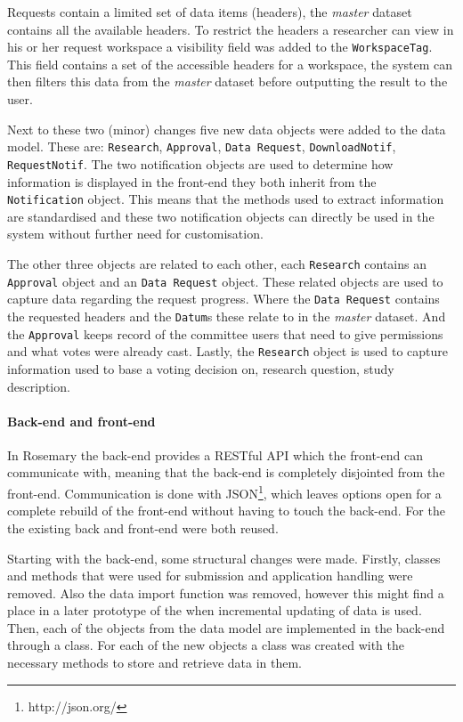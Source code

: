 Requests contain a limited set of data items (headers), the \emph{master} dataset contains all the available headers.
To restrict the headers a researcher can view in his or her request workspace a visibility field was added to the {\tt WorkspaceTag}.
This field contains a set of the accessible headers for a workspace, the system can then filters this data from the \emph{master} dataset before outputting the result to the user.

Next to these two (minor) changes five new data objects were added to the data model.
These are: {\tt Research}, {\tt Approval}, {\tt Data Request}, {\tt DownloadNotif}, {\tt RequestNotif}.
The two notification objects are used to determine how information is displayed in the front-end they both inherit from the {\tt Notification} object.
This means that the methods used to extract information are standardised and these two notification objects can directly be used in the system without further need for customisation.

The other three objects are related to each other, each {\tt Research} contains an {\tt Approval} object and an {\tt Data Request} object.
These related objects are used to capture data regarding the request progress.
Where the {\tt Data Request} contains the requested headers and the {\tt Datum}s these relate to in the \emph{master} dataset.
And the {\tt Approval} keeps record of the committee users that need to give permissions and what votes were already cast.
Lastly, the {\tt Research} object is used to capture information used to base a voting decision on, \eg{} research question, study description.

\paragraph{Back-end and front-end}
In Rosemary the back-end provides a RESTful API which the front-end can communicate with, meaning that the back-end is completely disjointed from the front-end.
Communication is done with JSON\footnote{http://json.org/}, which leaves options open for a complete rebuild of the front-end without having to touch the back-end.
For the \ivfsystem{} the existing back and front-end were both reused.

Starting with the back-end, some structural changes were made.
Firstly, classes and methods that were used for submission and application handling were removed.
Also the data import function was removed, however this might find a place in a later prototype of the \ivfsystem{} when incremental updating of data is used.
Then, each of the objects from the data model are implemented in the back-end through a class.
For each of the new objects a class was created with the necessary methods to store and retrieve data in them.

